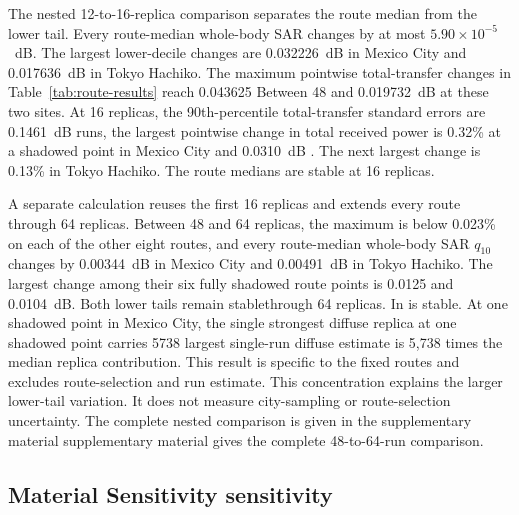 \documentclass{IEEEoj} %
\providecommand{\DIFadd}[1]{{\protect\color{blue} \sf #1}} %
\providecommand{\DIFdel}[1]{{\protect\color{red} \scriptsize #1}} %
\providecommand{\DIFaddbegin}{} %
\providecommand{\DIFaddend}{} %
\providecommand{\DIFdelbegin}{} %
\providecommand{\DIFdelend}{} %
\begin{document}
\DIFdelbegin \DIFdel{The nested 12-to-16-replica comparison separates the route median from the lower tail. Every route-median whole-body SAR changes by at most
$5.90\times10^{-5}$~dB. The largest lower-decile changes are 0.032226~dB in
Mexico City and 0.017636~dB in Tokyo Hachiko. The maximum pointwise total-transfer changes in Table~\ref{tab:route-results} reach 0.043625 }\DIFdelend %
\DIFaddbegin \DIFadd{Between 48 }\DIFaddend and \DIFdelbegin \DIFdel{0.019732~dB at these two sites. At 16 replicas, the 90th-percentile total-transfer standard errors are
0.1461~dB }\DIFdelend \DIFaddbegin \DIFadd{64 runs, the largest pointwise change in total received power is
0.32\% at a shadowed point }\DIFaddend in Mexico City\DIFdelbegin \DIFdel{and 0.0310~dB }\DIFdelend \DIFaddbegin \DIFadd{. The next largest change is 0.13\% }\DIFaddend in
Tokyo Hachiko. The \DIFdelbegin \DIFdel{route medians are
stable at 16 replicas.
}%

\DIFdel{A separate calculation reuses the first 16 replicas and extends every route
through 64 replicas. Between 48 and 64 replicas, the }\DIFdelend \DIFaddbegin \DIFadd{maximum is below 0.023\% on each of the other eight routes,
and every route-median }\DIFaddend whole-body SAR \DIFdelbegin \DIFdel{$q_{10}$ changes by 0.00344~dB in Mexico City and 0.00491~dB in Tokyo Hachiko.
The largest change among their six fully shadowed route points is 0.0125 and
0.0104~dB. Both lower tails remain stablethrough 64 replicas. In }\DIFdelend \DIFaddbegin \DIFadd{is stable. At one shadowed point in }\DIFaddend Mexico
City, the \DIFdelbegin \DIFdel{single strongest diffuse replica at one shadowed point
carries 5738 }\DIFdelend \DIFaddbegin \DIFadd{largest single-run diffuse estimate is 5,738 }\DIFaddend times the median \DIFdelbegin \DIFdel{replica contribution. This
result is specific to the fixed routes and excludes route-selection and
}\DIFdelend \DIFaddbegin \DIFadd{run estimate. This
concentration explains the larger lower-tail variation. It does not measure
}\DIFaddend city-sampling \DIFaddbegin \DIFadd{or route-selection }\DIFaddend uncertainty. The \DIFdelbegin \DIFdel{complete nested comparison is given in the
supplementary material }\DIFdelend \DIFaddbegin \DIFadd{supplementary material gives
the complete 48-to-64-run comparison}\DIFaddend .

\subsection{Material \DIFdelbegin \DIFdel{Sensitivity}\DIFdelend \DIFaddbegin \DIFadd{sensitivity}\DIFaddend }
\label{sec:material-sensitivity}
\end{document}
